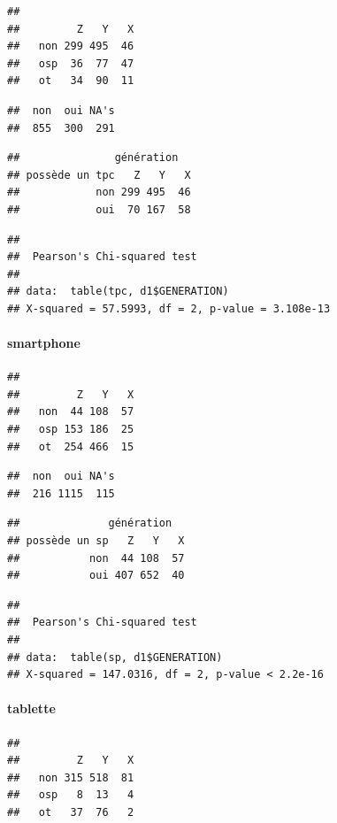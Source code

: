 \documentclass[]{article}
\begin{document}
\begin{verbatim}
##      
##         Z   Y   X
##   non 299 495  46
##   osp  36  77  47
##   ot   34  90  11
\end{verbatim}

\begin{verbatim}
##  non  oui NA's 
##  855  300  291
\end{verbatim}

\begin{verbatim}
##               génération
## possède un tpc   Z   Y   X
##            non 299 495  46
##            oui  70 167  58
\end{verbatim}

\begin{verbatim}
## 
##  Pearson's Chi-squared test
## 
## data:  table(tpc, d1$GENERATION)
## X-squared = 57.5993, df = 2, p-value = 3.108e-13
\end{verbatim}

\paragraph{smartphone}\label{smartphone}

\begin{verbatim}
##      
##         Z   Y   X
##   non  44 108  57
##   osp 153 186  25
##   ot  254 466  15
\end{verbatim}

\begin{verbatim}
##  non  oui NA's 
##  216 1115  115
\end{verbatim}

\begin{verbatim}
##              génération
## possède un sp   Z   Y   X
##           non  44 108  57
##           oui 407 652  40
\end{verbatim}

\begin{verbatim}
## 
##  Pearson's Chi-squared test
## 
## data:  table(sp, d1$GENERATION)
## X-squared = 147.0316, df = 2, p-value < 2.2e-16
\end{verbatim}

\paragraph{tablette}\label{tablette}

\begin{verbatim}
##      
##         Z   Y   X
##   non 315 518  81
##   osp   8  13   4
##   ot   37  76   2
\end{verbatim}
\end{document}
